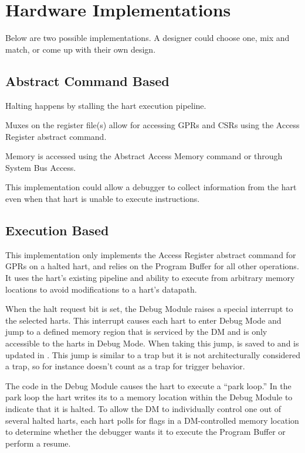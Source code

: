 \chapter{Hardware Implementations}
\label{sec:implementations}

Below are two possible implementations. A designer could choose one, mix and
match, or come up with their own design.

\section{Abstract Command Based}

Halting happens by stalling the hart execution pipeline.

Muxes on the register file(s) allow for accessing GPRs and CSRs
using the Access Register abstract command.

Memory is accessed using the Abstract Access Memory command or through System
Bus Access.

This implementation could allow a debugger to collect information from the hart
even when that hart is unable to execute instructions.

\section{Execution Based} \label{execution_based}

This implementation only implements the Access Register abstract command
for GPRs on a halted hart, and relies on the Program Buffer for all other
operations.
It uses the hart's existing pipeline
and ability to execute from arbitrary memory locations to avoid
modifications to a hart's datapath.

When the halt request bit is set, the Debug Module raises a special interrupt
to the selected harts. This interrupt causes each
hart to enter Debug Mode and jump to a defined
memory region that is serviced by the DM and is only accessible to the harts in Debug Mode.
When taking this jump, \Rpc is saved to \RcsrDpc and \FcsrDcsrCause is updated
in \RcsrDcsr.  This jump is similar to a trap but it is not architecturally
considered a trap, so for instance doesn't count as a trap for trigger behavior.

The code in the Debug Module causes the hart to execute a ``park loop.''
In the park loop the hart writes its \Rmhartid to a
memory location within the Debug Module to indicate that it is halted.
To allow the DM to individually control one out of several
halted harts, each hart polls for flags in a DM-controlled memory location
to determine whether the debugger wants it to
execute the Program Buffer or perform a resume.

